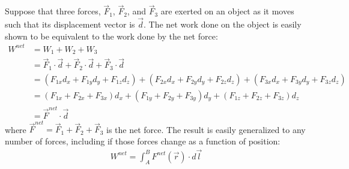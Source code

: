 Suppose that three forces, $\vec F_1$, $\vec F_2$, and $\vec F_3$ are exerted on an object as it moves such that its displacement vector is $\vec d$. The net work done on the object is easily shown to be equivalent to the work done by the net force:
\begin{align*}
W^{net} &= W_1 + W_2 + W_3 \\
&= \vec F_1 \cdot \vec d + \vec F_2 \cdot \vec d  + \vec F_3 \cdot \vec d \\
&=(F_{1x}d_x+F_{1y}d_y+F_{1z}d_z)+ (F_{2x}d_x+F_{2y}d_y+F_{2z}d_z) + (F_{3x}d_x+F_{3y}d_y+F_{3z}d_z)\\
&=(F_{1x} + F_{2x} + F_{3x})d_x+(F_{1y} + F_{2y} + F_{3y})d_y+(F_{1z} + F_{2z} + F_{3z})d_z\\
&=\vec F^{net} \cdot \vec d
\end{align*}
where $\vec F^{net} = \vec F_1 + \vec F_2 + \vec F_3$ is the net force. The result is easily generalized to any number of forces, including if those forces change as a function of position:
\begin{align*}
W^{net} = \int_A^B F^{net}(\vec r) \cdot d\vec l
\end{align*} 


